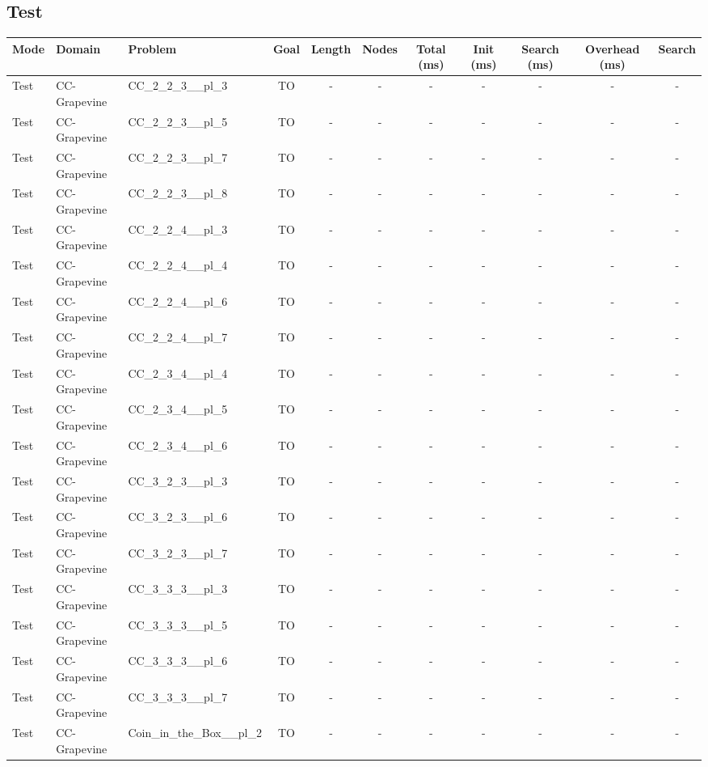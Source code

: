 \documentclass{article}
\begin{document}
\subsection*{Test}
\begin{tabular}{lllcccccccc}
\toprule
Mode & Domain & Problem & Goal & Length & Nodes & Total (ms) & Init (ms) & Search (ms) & Overhead (ms) & Search \\
\midrule
Test & CC-Grapevine & CC\_2\_2\_3\_\_pl\_3 & TO & - & - & - & - & - & - & - \\
Test & CC-Grapevine & CC\_2\_2\_3\_\_pl\_5 & TO & - & - & - & - & - & - & - \\
Test & CC-Grapevine & CC\_2\_2\_3\_\_pl\_7 & TO & - & - & - & - & - & - & - \\
Test & CC-Grapevine & CC\_2\_2\_3\_\_pl\_8 & TO & - & - & - & - & - & - & - \\
Test & CC-Grapevine & CC\_2\_2\_4\_\_pl\_3 & TO & - & - & - & - & - & - & - \\
Test & CC-Grapevine & CC\_2\_2\_4\_\_pl\_4 & TO & - & - & - & - & - & - & - \\
Test & CC-Grapevine & CC\_2\_2\_4\_\_pl\_6 & TO & - & - & - & - & - & - & - \\
Test & CC-Grapevine & CC\_2\_2\_4\_\_pl\_7 & TO & - & - & - & - & - & - & - \\
Test & CC-Grapevine & CC\_2\_3\_4\_\_pl\_4 & TO & - & - & - & - & - & - & - \\
Test & CC-Grapevine & CC\_2\_3\_4\_\_pl\_5 & TO & - & - & - & - & - & - & - \\
Test & CC-Grapevine & CC\_2\_3\_4\_\_pl\_6 & TO & - & - & - & - & - & - & - \\
Test & CC-Grapevine & CC\_3\_2\_3\_\_pl\_3 & TO & - & - & - & - & - & - & - \\
Test & CC-Grapevine & CC\_3\_2\_3\_\_pl\_6 & TO & - & - & - & - & - & - & - \\
Test & CC-Grapevine & CC\_3\_2\_3\_\_pl\_7 & TO & - & - & - & - & - & - & - \\
Test & CC-Grapevine & CC\_3\_3\_3\_\_pl\_3 & TO & - & - & - & - & - & - & - \\
Test & CC-Grapevine & CC\_3\_3\_3\_\_pl\_5 & TO & - & - & - & - & - & - & - \\
Test & CC-Grapevine & CC\_3\_3\_3\_\_pl\_6 & TO & - & - & - & - & - & - & - \\
Test & CC-Grapevine & CC\_3\_3\_3\_\_pl\_7 & TO & - & - & - & - & - & - & - \\
Test & CC-Grapevine & Coin\_in\_the\_Box\_\_pl\_2 & TO & - & - & - & - & - & - & - \\

\end{tabular}
\end{document}
